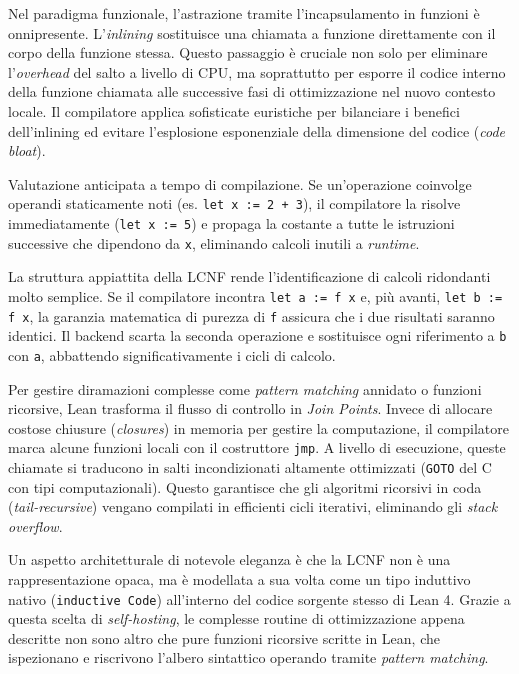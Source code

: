 \begin{description}[leftmargin=1.5em, style=nextline, font=\bfseries]
    \item [Inlining (Espansione delle chiamate)] 
        Nel paradigma funzionale, l'astrazione tramite l'incapsulamento in funzioni è onnipresente. L'\textit{inlining} sostituisce una chiamata a funzione direttamente con il corpo della funzione stessa. Questo passaggio 
        è cruciale non solo per eliminare l'\textit{overhead} del salto a livello di CPU, ma soprattutto per esporre il codice interno della funzione chiamata alle successive fasi di ottimizzazione nel nuovo contesto locale. 
        Il compilatore applica sofisticate euristiche per bilanciare i benefici dell'inlining ed evitare l'esplosione esponenziale della dimensione del codice (\textit{code bloat}).
    \item [Constant Folding, Propagation] 
        Valutazione anticipata a tempo di compilazione. Se un'operazione coinvolge operandi staticamente noti (es. \texttt{let x := 2 + 3}), il compilatore la risolve immediatamente (\texttt{let x := 5}) e propaga la costante 
        a tutte le istruzioni successive che dipendono da \texttt{x}, eliminando calcoli inutili a \textit{runtime}.
    \item [Common Subexpression Elimination] 
        La struttura appiattita della LCNF rende l'identificazione di calcoli ridondanti molto semplice. Se il compilatore incontra \texttt{let a := f x} e, più avanti, \texttt{let b := f x}, la garanzia matematica di purezza 
        di \texttt{f} assicura che i due risultati saranno identici. Il backend scarta la seconda operazione e sostituisce ogni riferimento a \texttt{b} con \texttt{a}, abbattendo significativamente i cicli di calcolo.
    \item [Join Points, Tail Recursion] 
        Per gestire diramazioni complesse come \textit{pattern matching} annidato o funzioni ricorsive, Lean trasforma il flusso di controllo in \textit{Join Points}. Invece di allocare costose chiusure (\textit{closures}) 
        in memoria per gestire la computazione, il compilatore marca alcune funzioni locali con il costruttore \texttt{jmp}. A livello di esecuzione, queste chiamate si traducono in salti incondizionati altamente ottimizzati 
        (\texttt{GOTO} del C con tipi computazionali). Questo garantisce che gli algoritmi ricorsivi in coda (\textit{tail-recursive}) vengano compilati in efficienti cicli iterativi, eliminando gli \textit{stack overflow}.
\end{description}
Un aspetto architetturale di notevole eleganza è che la LCNF non è una rappresentazione opaca, ma è modellata a sua volta come un tipo induttivo nativo (\texttt{inductive Code}) all'interno del codice sorgente 
stesso di Lean 4. Grazie a questa scelta di \textit{self-hosting}, le complesse routine di ottimizzazione appena descritte non sono altro che pure funzioni ricorsive scritte in Lean, che ispezionano e riscrivono 
l'albero sintattico operando tramite \textit{pattern matching}.

